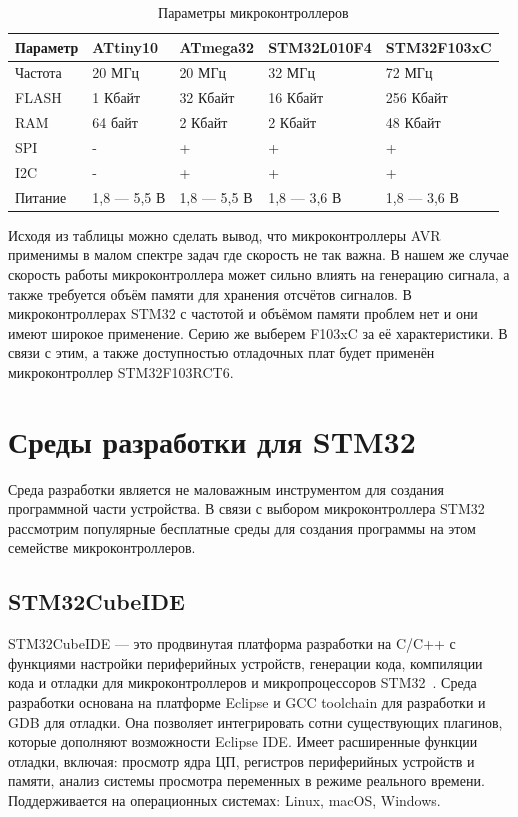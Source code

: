 \begin{table}[H]
\caption{Параметры микроконтроллеров}
\begin{tabular}{|p{2.5 cm}|p{3 cm}|p{3 cm}|p{3.1 cm}|p{3.1 cm}|}
\hline
        Параметр & ATtiny10 & ATmega32 & STM32L010F4 & STM32F103xC \\ \hline
        Частота & 20 МГц & 20 МГц & 32 МГц & 72 МГц \\ \hline
        FLASH & 1 Кбайт & 32 Кбайт & 16 Кбайт & 256 Кбайт \\ \hline
        RAM & 64 байт & 2 Кбайт & 2 Кбайт & 48 Кбайт \\ \hline
        SPI & - & + & + & + \\ \hline
        I2C & - & +	 & + & + \\ \hline
        Питание & 1,8 --- 5,5 В & 1,8 --- 5,5 В & 1,8 --- 3,6 В & 1,8 --- 3,6 В \\ \hline
\end{tabular}
\end{table}
	
	Исходя из таблицы можно сделать вывод, что микроконтроллеры AVR применимы в малом спектре задач где скорость не так важна. В нашем же случае скорость работы микроконтроллера может сильно влиять на генерацию сигнала, а также требуется объём памяти для хранения отсчётов сигналов. В микроконтроллерах STM32 с частотой и объёмом памяти проблем нет и они имеют широкое применение. Серию же выберем F103xC за её характеристики. В связи с этим, а также доступностью отладочных плат будет применён микроконтроллер STM32F103RCT6.

\section{Среды разработки для STM32}

	Среда разработки является не маловажным инструментом для создания программной части устройства. В связи с выбором микроконтроллера STM32 рассмотрим популярные бесплатные среды для создания программы на этом семействе микроконтроллеров.

\subsection{STM32CubeIDE}

	
	STM32CubeIDE --- это продвинутая платформа разработки на C/C++ с функциями настройки периферийных устройств, генерации кода, компиляции кода и отладки для микроконтроллеров и микропроцессоров STM32~\cite{cube}. Среда разработки основана на платформе Eclipse и GCC toolchain для разработки и GDB для отладки. Она позволяет интегрировать сотни существующих плагинов, которые дополняют возможности Eclipse IDE. Имеет расширенные функции отладки, включая: просмотр ядра ЦП, регистров периферийных устройств и памяти, анализ системы просмотра переменных в режиме реального времени. Поддерживается на операционных системах: Linux, macOS, Windows.
	
